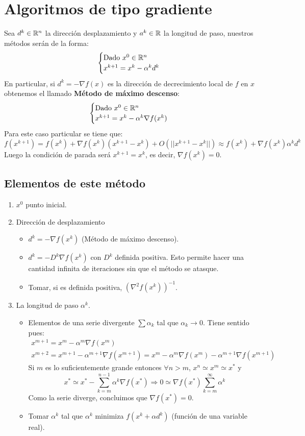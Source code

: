 \documentclass[PM.tex]{subfiles}
\begin{document}
\section{Algoritmos de tipo gradiente}
Sea $d^k \in\mathbb{R}^n$ la dirección desplazamiento y $a^k \in \mathbb{R}$ la longitud de paso, nuestros métodos serán de la forma:
\[
\begin{cases}
\text{Dado $x^0\in \mathbb{R}^n$}\\
x^{k+1} = x^k - \alpha^k d^k
\end{cases}
\]
En particular, si $d^k=-\nabla f(x)$ es la dirección de decrecimiento local de $f$ en $x$ obtenemos el llamado \textbf{Método de máximo descenso}:
\[
\begin{cases}
\text{Dado $x^0\in \mathbb{R}^n$}\\
x^{k+1} = x^k - \alpha^k \nabla f(x^k)
\end{cases}
\]
Para este caso particular se tiene que:
\[
f(x^{k+1})=f(x^k)+\nabla f(x^k)(x^{k+1}-x^k) + O(||x^{k+1}-x^k||) \approx f(x^k)+\nabla f(x^k)\alpha^k d^k
\]
Luego la condición de parada será $x^{k+1}=x^k$, es decir, $\nabla f(x^k)=0$. 
\subsection{Elementos de este método}
\begin{enumerate}
\item $x^0$ punto inicial.
\item Dirección de desplazamiento
\begin{itemize}
\item $d^k = -\nabla f(x^k)$ (Método de máximo descenso).
\item $d^k = -D^k \nabla f(x^k)$ con $D^k$ definida positiva. Esto permite hacer una cantidad infinita de iteraciones sin que el método se atasque.
\item Tomar, si es definida positiva, $(\nabla^2 f(x^k))^{-1}$.
\end{itemize}
\item La longitud de paso $\alpha^k$.
\begin{itemize}
\item Elementos de una serie divergente $\sum \alpha_k$ tal que $\alpha_k \rightarrow 0$. Tiene sentido pues:
\begin{gather*}
x^{m+1} = x^m - \alpha^m \nabla f(x^{m})\\
 x^{m+2} = x^{m+1} - \alpha^{m+1} \nabla f(x^{m+1}) =  x^m - \alpha^m \nabla f(x^{m}) -\alpha^{m+1} \nabla f(x^{m+1})
\end{gather*}
Si $m$ es lo suficientemente grande entonces $\forall n>m$, $x^n \simeq x^m \simeq x^*$ y
\[
x^* \simeq x^* - \sum^{n-1}_{k=m} \alpha^k \nabla f(x^*) \Rightarrow 0 \simeq \nabla f(x^*)\sum_{k=m}^\infty \alpha^k
\]
Como la serie diverge, concluimos que $\nabla f(x^*)=0$.
\item Tomar $\alpha^k$ tal que $\alpha^k$ minimiza $f(x^k+\alpha d^k)$ (función de una variable real).
\end{itemize}
\end{enumerate}
\end{document}
